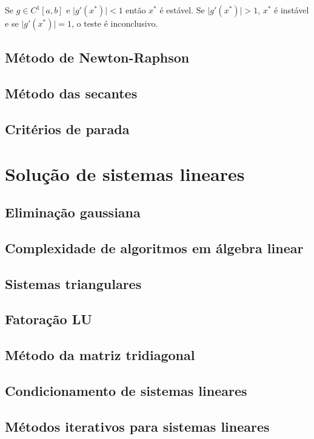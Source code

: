 \documentclass{article}
\begin{document}
\begin{prop} 
    Se \(g \in C^1[a,b]\) e \(\vert g'(x^{*}) \vert < 1\) então \(x^{*}\) é estável. Se \(\vert g'(x^{*}) \vert > 1\), \(x^{*}\) é instável e se \(\vert g'(x^{*}) \vert = 1\), o teste é inconclusivo.
\end{prop}

\subsection{Método de Newton-Raphson}
\subsection{Método das secantes}
\subsection{Critérios de parada}

\section{Solução de sistemas lineares}

\subsection{Eliminação gaussiana}
\subsection{Complexidade de algoritmos em álgebra linear}
\subsection{Sistemas triangulares}
\subsection{Fatoração LU}
\subsection{Método da matriz tridiagonal}
\subsection{Condicionamento de sistemas lineares}
\subsection{Métodos iterativos para sistemas lineares}
\end{document}
